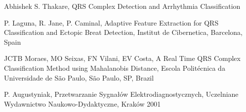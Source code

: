 \begin{thebibliography}{99}
Abhishek S. Thakare,
\newblock QRS Complex Detection and Arrhythmia Classification

P. Laguna, R. Jane, P. Caminal,
\newblock Adaptive Feature Extraction for QRS Classification and Ectopic Breat Detection,
\newblock Institut de Cibernetica, Barcelona, Spain


JCTB Moraes, MO Seixas, FN Vilani, EV Costa,
\newblock A Real Time QRS Complex Classification Method using Mahalanobis Distance,
\newblock Escola Politécnica da Universidade de São Paulo, São Paulo, SP, Brazil

P. Augustyniak,
\newblock Przetwarzanie Sygnałów Elektrodiagnostycznych,
\newblock Uczelniane Wydawnictwo Naukowo-Dydaktyczne, Kraków 2001

\end{thebibliography}